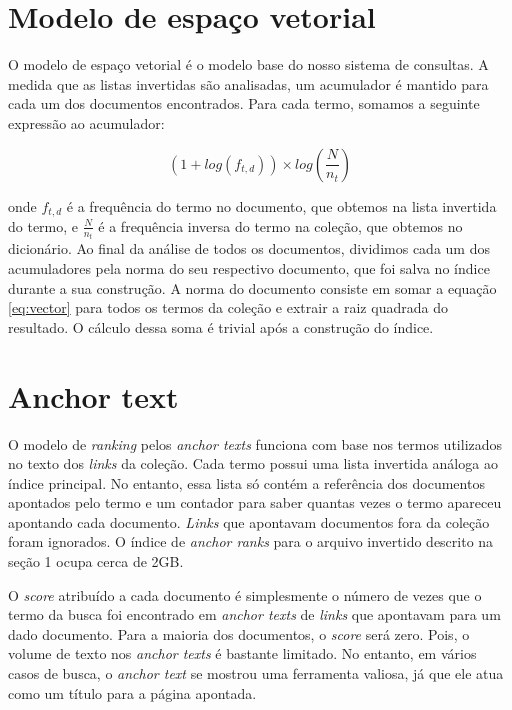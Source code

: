 \documentclass{article}
\begin{document}
\section{Modelo de espaço vetorial}

O modelo de espaço vetorial é o modelo base do nosso sistema de consultas. A medida que as
listas invertidas são analisadas, um acumulador é mantido para cada um dos documentos 
encontrados. Para cada termo, somamos a seguinte expressão ao acumulador:

\begin{equation}
(1 + log(f_{t,d})) \times log(\frac{N}{n_t})
\label{eq:vector}
\end{equation}

onde $ f_{t,d} $ é a frequência do termo no documento, que obtemos na lista invertida do termo, e
$ \frac{N}{n_t} $ é a frequência inversa do termo na coleção, que obtemos no dicionário. Ao
final da análise de todos os documentos, dividimos cada um dos acumuladores pela norma do
seu respectivo documento, que foi salva no índice durante a sua construção. A norma do documento consiste
em somar a equação \ref{eq:vector} para todos os termos da coleção e extrair
a raiz quadrada do resultado. O cálculo dessa soma é trivial após a construção do índice.

\section{Anchor text}

O modelo de \textit{ranking} pelos \textit{anchor texts} funciona com base nos termos
utilizados no texto dos \textit{links} da coleção. Cada termo possui uma lista invertida análoga ao índice principal.
No entanto, essa lista só contém a referência dos documentos apontados pelo 
termo e um contador para saber quantas vezes o termo apareceu apontando cada documento.
\textit{Links} que apontavam documentos fora da coleção foram ignorados. 
O índice de \textit{anchor ranks} para o arquivo invertido descrito na seção 1 ocupa cerca de 2GB.

O \textit{score} atribuído a cada documento é simplesmente o número de vezes que o termo da busca 
foi encontrado em \textit{anchor texts} de \textit{links} que apontavam para um dado documento. 
Para a maioria dos documentos, o \textit{score} será zero. Pois, o volume de texto nos \textit{anchor texts}
é bastante limitado. No entanto, em vários casos de busca, o \textit{anchor text} se mostrou uma 
ferramenta valiosa, já que ele atua como um título para a página apontada.
\end{document}
